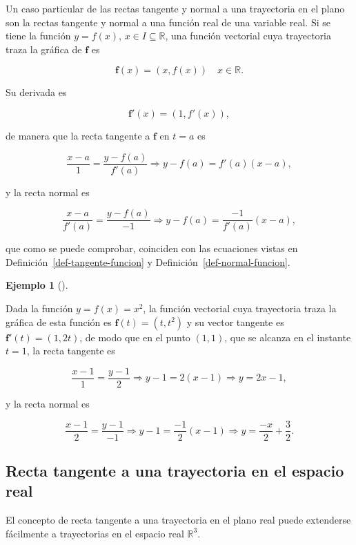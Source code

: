 \documentclass[
  a4paper,
]{scrreport}
\theoremstyle{definition}
\theoremstyle{plain}
\theoremstyle{plain}
\theoremstyle{definition}
\theoremstyle{definition}
\newtheorem{example}{Ejemplo}[chapter]
\theoremstyle{plain}
\theoremstyle{remark}
\begin{document}
Un caso particular de las rectas tangente y normal a una trayectoria en
el plano son la rectas tangente y normal a una función real de una
variable real. Si se tiene la función \(y=f(x)\),
\(x\in I\subseteq \mathbb{R}\), una función vectorial cuya trayectoria
traza la gráfica de \(\mathbf{f}\) es

\[
\mathbf{f}(x) = (x,f(x))  \quad x\in \mathbb{R}.
\]

Su derivada es

\[
\mathbf{f}'(x) = (1,f'(x)),
\]

de manera que la recta tangente a \(\mathbf{f}\) en \(t=a\) es

\[
\frac{x-a}{1} = \frac{y-f(a)}{f'(a)} \Rightarrow y-f(a) = f'(a)(x-a),
\]

y la recta normal es

\[
\frac{x-a}{f'(a)} = \frac{y-f(a)}{-1} \Rightarrow y-f(a) = \frac{-1}{f'(a)}(x-a),
\]

que como se puede comprobar, coinciden con las ecuaciones vistas en
Definición~\ref{def-tangente-funcion} y
Definición~\ref{def-normal-funcion}.

\begin{example}[]\protect\hypertarget{exm-tangente-normal-funcion}{}\label{exm-tangente-normal-funcion}

Dada la función \(y=f(x)=x^2\), la función vectorial cuya trayectoria
traza la gráfica de esta función es \(\mathbf{f}(t)=(t,t^2)\) y su
vector tangente es \(\mathbf{f}'(t)=(1,2t)\), de modo que en el punto
\((1,1)\), que se alcanza en el instante \(t=1\), la recta tangente es

\[
\frac{x-1}{1} = \frac{y-1}{2} \Rightarrow y-1 = 2(x-1) \Rightarrow y = 2x-1,
\]

y la recta normal es

\[
\frac{x-1}{2} = \frac{y-1}{-1} \Rightarrow y-1 = \frac{-1}{2}(x-1) \Rightarrow y = \frac{-x}{2}+\frac{3}{2}.
\]

\end{example}

\hypertarget{recta-tangente-a-una-trayectoria-en-el-espacio-real}{%
\subsection{Recta tangente a una trayectoria en el espacio
real}\label{recta-tangente-a-una-trayectoria-en-el-espacio-real}}

El concepto de recta tangente a una trayectoria en el plano real puede
extenderse fácilmente a trayectorias en el espacio real
\(\mathbb{R}^3\).
\end{document}
